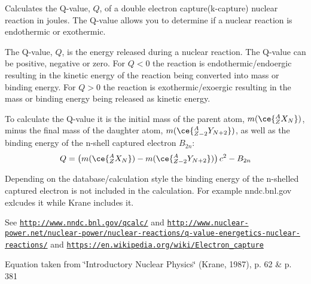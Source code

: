 Calculates the Q-\/value, $Q$, of a double electron capture(k-\/capture) nuclear reaction in joules. The Q-\/value allows you to determine if a nuclear reaction is endothermic or exothermic. 

The Q-\/value, $Q$, is the energy released during a nuclear reaction. The Q-\/value can be positive, negative or zero. For $Q < 0$ the reaction is endothermic/endoergic resulting in the kinetic energy of the reaction being converted into mass or binding energy. For $Q > 0$ the reaction is exothermic/exoergic resulting in the mass or binding energy being released as kinetic energy.

To calculate the Q-\/value it is the initial mass of the parent atom, $m(\ce{ ^{A}_{Z}X_{N} })$, minus the final mass of the daughter atom, $m(\ce{ ^{A}_{Z -2}Y_{N +2} })$, as well as the binding energy of the n-\/shell captured electron $B_{2n}$\+: \[Q = \left ( m(\ce{ ^{A}_{Z}X_{N} })-m(\ce{ ^{A}_{Z -2}Y_{N +2} }) \right) c^2-B_{2n}\]

Depending on the database/calculation style the binding energy of the n-\/shelled captured electron is not included in the calculation. For example nndc.\+bnl.\+gov exlcudes it while Krane includes it.

See \href{http://www.nndc.bnl.gov/qcalc/}{\tt http\+://www.\+nndc.\+bnl.\+gov/qcalc/} and \href{http://www.nuclear-power.net/nuclear-power/nuclear-reactions/q-value-energetics-nuclear-reactions/}{\tt http\+://www.\+nuclear-\/power.\+net/nuclear-\/power/nuclear-\/reactions/q-\/value-\/energetics-\/nuclear-\/reactions/} and \href{https://en.wikipedia.org/wiki/Electron_capture}{\tt https\+://en.\+wikipedia.\+org/wiki/\+Electron\+\_\+capture}

Equation taken from \char`\"{}\+Introductory Nuclear Physics\char`\"{} (Krane, 1987), p. 62 \& p. 381


